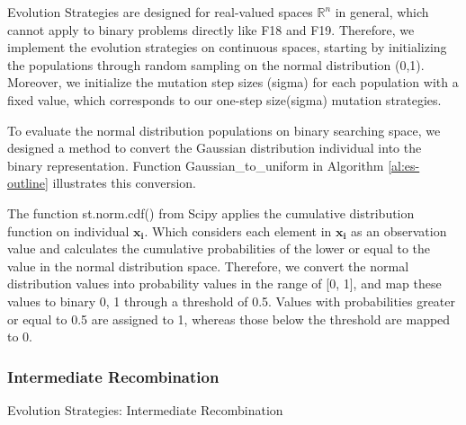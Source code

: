 \documentclass{article}
\begin{document}
Evolution Strategies are designed for real-valued spaces \(\mathbb{R}^n\) in general, which cannot apply to binary problems directly like F18 and F19. Therefore, we implement the evolution strategies on continuous spaces, starting by initializing the populations through random sampling on the normal distribution (0,1). Moreover, we initialize the mutation step sizes (sigma) for each population with a fixed value, which corresponds to our one-step size(sigma) mutation strategies. 

To evaluate the normal distribution populations on binary searching space, we designed a method to convert the Gaussian distribution individual into the binary representation. Function Gaussian\_to\_uniform in Algorithm \ref{al:es-outline} illustrates this conversion.


The function st.norm.cdf() from Scipy applies the cumulative distribution function on individual $\mathbf{x_i}$. Which considers each element in $\mathbf{x_i}$ as an observation value and calculates the cumulative probabilities of the lower or equal to the value in the normal distribution space.  Therefore, we convert the normal distribution values into probability values in the range of [0, 1], and map these values to binary {0, 1} through a threshold of 0.5. Values with probabilities greater or equal to 0.5 are assigned to 1, whereas those below the threshold are mapped to 0. 

\subsubsection{Intermediate Recombination}

\begin{algorithm}[!ht]
\SetAlgoLined
{}
\BlankLine
{}

\caption{Evolution Strategies: Intermediate Recombination}\label{al:es-recombine}
\end{algorithm}
\end{document}

